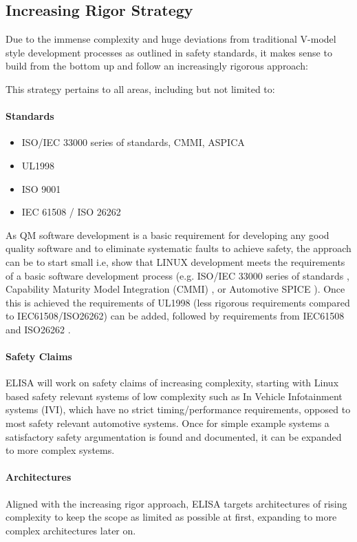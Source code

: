 \documentclass[12pt]{ElisaPaper}
\begin{document}
\subsection{Increasing Rigor Strategy}
Due to the immense complexity and huge deviations from traditional V-model style development processes as outlined in safety standards, it makes sense to build from the bottom up and follow an increasingly rigorous approach:

This strategy pertains to all areas, including but not limited to:
\paragraph{Standards}
\begin{itemize}
	\item ISO/IEC 33000 series of standards, CMMI, ASPICA \cite{ISO3300x:2015,CMMI,ASPICE}
	\item UL1998 \cite{UL1998}
	\item ISO 9001 \cite{ISO9001:2015}
	\item IEC 61508 / ISO 26262 \cite{IEC61508:2010,ISO26262:2018}
\end{itemize}
As QM software development is a basic requirement for developing any good quality software and to eliminate systematic faults to achieve safety, the approach can be to start small i.e, show that LINUX development meets the requirements of a basic software development process (e.g. ISO/IEC 33000 series of standards \cite{ISO3300x:2015}, Capability Maturity Model Integration (CMMI) \cite{CMMI}, or Automotive SPICE \cite{ASPICE}). Once this is achieved the requirements of UL1998 \cite{UL1998} (less rigorous requirements compared to IEC61508/ISO26262) can be added, followed by requirements from IEC61508 and ISO26262 \cite{IEC61508:2010,ISO26262:2018}.
\paragraph{Safety Claims}
ELISA will work on safety claims of increasing complexity, starting with Linux based safety relevant systems of low complexity such as In Vehicle Infotainment systems (IVI), which have no strict timing/performance requirements, opposed to most safety relevant automotive systems. 
Once for simple example systems a satisfactory safety argumentation is found and documented, it can be expanded to more complex systems.
\paragraph{Architectures}
Aligned with the increasing rigor approach, ELISA targets architectures of rising complexity to keep the scope as limited as possible at first, expanding to more complex architectures later on.
\end{document}
